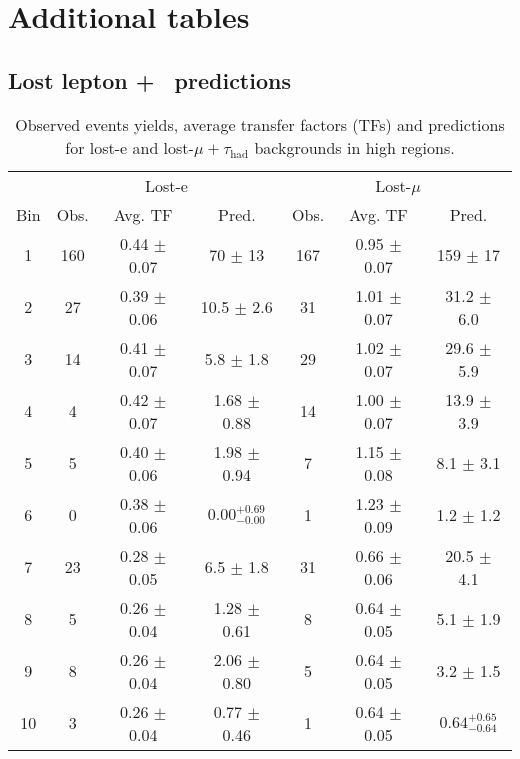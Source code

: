 \chapter{Additional tables} %

\label{AppendixB}
\section{Lost lepton + \tauh\ predictions}
\begin{table}[h!]
\small
\centering
\caption[Lost lepton predictions in high \dphi]{Observed events yields, average transfer factors (TFs) and predictions for lost-e and 
lost-$\mu+\tau_{\text{had}}$ backgrounds in high \dphi regions.}
\label{tab:lostLeptonPredictions}
\begin{tabular}{c|c|c|c|c|c|c}
\hline
     &  \multicolumn{3}{c}{Lost-e} & \multicolumn{3}{c}{Lost-$\mu$} \\\cline{2-7}
Bin & Obs. & Avg. TF & Pred. & Obs. & Avg. TF &  Pred. \\ 
\hline \hline
1 & 160  & 0.44  $\pm$  0.07  & 70 $\pm$ 13 & 167  & 0.95  $\pm$  0.07  & 159 $\pm$ 17     \\\hline
2 & 27  & 0.39  $\pm$  0.06  & 10.5 $\pm$ 2.6 & 31  & 1.01  $\pm$  0.07  & 31.2 $\pm$ 6.0     \\\hline
3 & 14  & 0.41  $\pm$  0.07  & 5.8 $\pm$ 1.8 & 29  & 1.02  $\pm$  0.07  & 29.6 $\pm$ 5.9     \\\hline
4 & 4  & 0.42  $\pm$  0.07  & 1.68 $\pm$ 0.88 & 14  & 1.00  $\pm$  0.07  & 13.9 $\pm$ 3.9     \\\hline
5 & 5  & 0.40  $\pm$  0.06  & 1.98 $\pm$ 0.94 & 7  & 1.15  $\pm$  0.08  & 8.1 $\pm$ 3.1     \\\hline
6 & 0  & 0.38  $\pm$  0.06  & $0.00 _{-0.00}^{+0.69}$ & 1  & 1.23  $\pm$  0.09  & 1.2 $\pm$ 1.2     \\\hline
7 & 23  & 0.28  $\pm$  0.05  & 6.5 $\pm$ 1.8 & 31  & 0.66  $\pm$  0.06  & 20.5 $\pm$ 4.1     \\\hline
8 & 5  & 0.26  $\pm$  0.04  & 1.28 $\pm$ 0.61 & 8  & 0.64  $\pm$  0.05  & 5.1 $\pm$ 1.9     \\\hline
9 & 8  & 0.26  $\pm$  0.04  & 2.06 $\pm$ 0.80 & 5  & 0.64  $\pm$  0.05  & 3.2 $\pm$ 1.5     \\\hline
10 & 3  & 0.26  $\pm$  0.04  & 0.77 $\pm$ 0.46 & 1  & 0.64  $\pm$  0.05  & $0.64^{+0.65}_{-0.64}$     \\\hline

\end{tabular}
\end{table}
